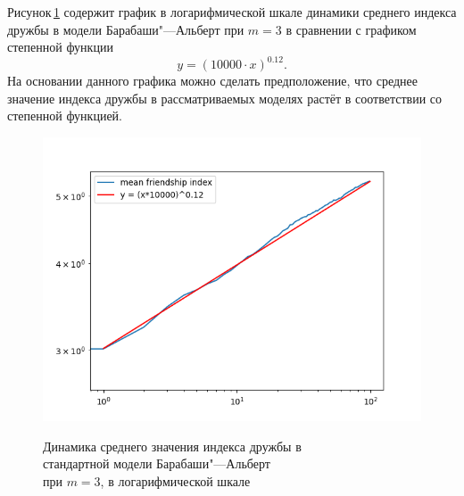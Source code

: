 \documentclass[bachelor, och, diploma]{SCWorks}
\begin{document}
Рисунок\,\ref{fig:badl3} содержит график в логарифмической шкале динамики среднего индекса дружбы в модели Барабаши"---Альберт при $m=3$ в сравнении с графиком степенной функции 
\[
y=(10000 \cdot x)^{0.12}.
\]
На основании данного графика можно сделать предположение, что среднее значение индекса дружбы в рассматриваемых моделях растёт в соответствии со степенной функцией. 
\begin{figure}[!ht]
\centering
\includegraphics[scale=0.7]{diploma_results/dynamic_log/ba_mean_beta_3.png}\\
\caption{Динамика среднего значения индекса дружбы  в\\ стандартной модели Барабаши"---Альберт\\ при $m=3$, в логарифмической шкале}\label{fig:badl3}
\end{figure}
\end{document}
